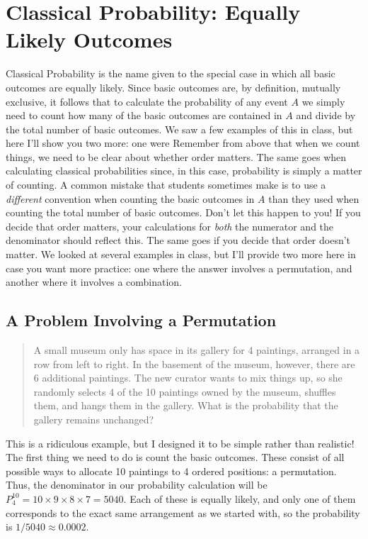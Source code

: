 \documentclass[12pt]{article}
\begin{document}
\section*{Classical Probability: Equally Likely Outcomes}
Classical Probability is the name given to the special case in which all basic outcomes are equally likely.
Since basic outcomes are, by definition, mutually exclusive, it follows that to calculate the probability of any event $A$ we simply need to count how many of the basic outcomes are contained in $A$ and divide by the total number of basic outcomes.
We saw a few examples of this in class, but here I'll show you two more: one were
Remember from above that when we count things, we need to be clear about whether order matters.
The same goes when calculating classical probabilities since, in this case, probability is simply a matter of counting.
A common mistake that students sometimes make is to use a \emph{different} convention when counting the basic outcomes in $A$ than they used when counting the total number of basic outcomes.
Don't let this happen to you!
If you decide that order matters, your calculations for \emph{both} the numerator and the denominator should reflect this.
The same goes if you decide that order doesn't matter.
We looked at several examples in class, but I'll provide two more here in case you want more practice: one where the answer involves a permutation, and another where it involves a combination.

\subsection*{A Problem Involving a Permutation}
\begin{quote}
  A small museum only has space in its gallery for 4 paintings, arranged in a row from left to right.
  In the basement of the museum, however, there are 6 additional paintings.
  The new curator wants to mix things up, so she randomly selects 4 of the 10 paintings owned by the museum, shuffles them, and hangs them in the gallery.
  What is the probability that the gallery remains unchanged?
\end{quote}
This is a ridiculous example, but I designed it to be simple rather than realistic!
The first thing we need to do is count the basic outcomes.
These consist of all possible ways to allocate 10 paintings to 4 ordered positions: a permutation.
Thus, the denominator in our probability calculation will be $P^{10}_{4}=10\times 9 \times 8 \times 7 =5040$.
Each of these is equally likely, and only one of them corresponds to the exact same arrangement as we started with, so the probability is $1/5040 \approx 0.0002$.
\end{document}

